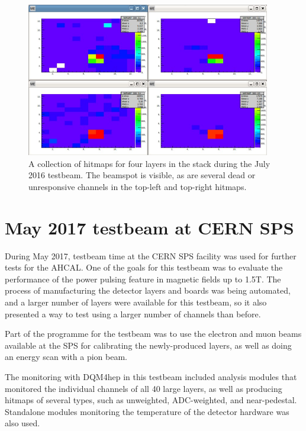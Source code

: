 \begin{figure}[p]
	\centering
	\includegraphics[width=0.95\textwidth]{../Pictures/AHCALHitmapFour.png}
	\caption{A collection of hitmaps for four layers in the stack during the July 2016 testbeam. The beamspot is visible, as are several dead or unresponsive channels in the top-left and top-right hitmaps.}
	\label{figure:aida/july2016/four-hitmap}
\end{figure}


\section{May 2017 testbeam at CERN SPS} %
During May 2017, testbeam time at the \acrshort{CERN} \acrfull{SPS} facility was used for further tests for the \acrshort{AHCAL}. One of the goals for this testbeam was to evaluate the performance of the power pulsing feature in magnetic fields up to 1.5T. The process of manufacturing the detector layers and boards was being automated, and a larger number of layers were available for this testbeam, so it also presented a way to test using a larger number of channels than before. 

Part of the programme for the testbeam was to use the electron and muon beams available at the \acrshort{SPS} for calibrating the newly-produced layers, as well as doing an energy scan with a pion beam.

The monitoring with \acrshort{DQM4hep} in this testbeam included analysis modules that monitored the individual channels of all 40 large layers, as well as producing hitmaps of several types, such as unweighted, \acrshort{ADC}-weighted, and near-pedestal. Standalone modules monitoring the temperature of the detector hardware was also used. 

